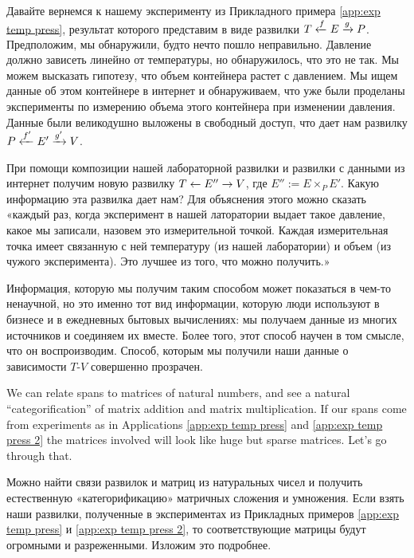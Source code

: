 \begin{applicationRUS}\label{app:exp temp press 2}
Давайте вернемся к нашему эксперименту из Прикладного примера \ref{app:exp temp press}, результат которого представим в виде развилки $T\xleftarrow{f}E\xrightarrow{g}P$. Предположим, мы обнаружили, будто нечто пошло неправильно. Давление должно зависеть линейно от температуры, но обнаружилось, что это не так. Мы можем высказать гипотезу, что объем контейнера растет с давлением. Мы ищем данные об этом контейнере в интернет и обнаруживаем, что уже были проделаны эксперименты по измерению объема этого контейнера при изменении давления. Данные были великодушно выложены в свободный доступ, что дает нам развилку $P\xleftarrow{f'}E'\xrightarrow{g'}V$. 

При помощи композиции нашей лабораторной развилки и развилки с данными из интернет получим новую развилку $T\leftarrow E''\rightarrow V$, где $E'':=E\times_PE'$. Какую информацию эта развилка дает нам? Для объяснения этого можно сказать «каждый раз, когда эксперимент в нашей латоратории выдает такое давление, какое мы записали, назовем это измерительной точкой. Каждая измерительная точка имеет связанную с ней температуру (из нашей лаборатории) и объем (из чужого эксперимента). Это лучшее из того, что можно получить.»

Информация, которую мы получим таким способом может показаться в чем-то ненаучной, но это именно тот вид информации, которую люди используют в бизнесе и в ежедневных бытовых вычислениях: мы получаем данные из многих источников и соединяем их вместе. Более того, этот способ научен в том смысле, что он воспроизводим. Способ, которым мы получили наши данные о зависимости $T$-$V$ совершенно прозрачен.
\end{applicationRUS}

\begin{blockENG}
We can relate spans to matrices of natural numbers, and see a natural “categorification” of matrix addition and matrix multiplication. If our spans come from experiments as in Applications \ref{app:exp temp press} and \ref{app:exp temp press 2} the matrices involved will look like huge but sparse matrices. Let's go through that.
\end{blockENG}

\begin{blockRUS}
Можно найти связи развилок и матриц из натуральных чисел и получить естественную «категорификацию» матричных сложения и умножения. Если взять наши развилки, полученные в экспериментах из Прикладных примеров \ref{app:exp temp press} и \ref{app:exp temp press 2}, то соответствующие матрицы будут огромными и разреженными. Изложим это подробнее.
\end{blockRUS}

